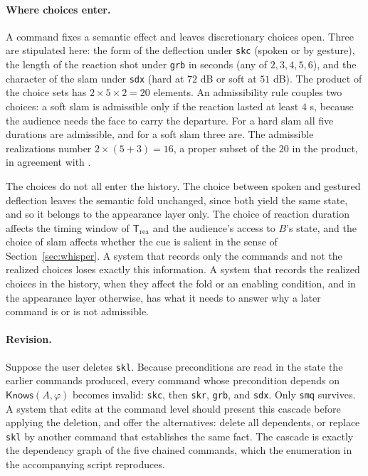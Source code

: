 \paragraph{Where choices enter.} A command fixes a semantic effect and leaves discretionary choices open. Three are stipulated here: the form of the deflection under \texttt{skc} (spoken or by gesture), the length of the reaction shot under \texttt{grb} in seconds (any of $2,3,4,5,6$), and the character of the slam under \texttt{sdx} (hard at $72$ dB or soft at $51$ dB). The product of the choice sets has $2\times5\times2=20$ elements. An admissibility rule couples two choices: a soft slam is admissible only if the reaction lasted at least $4$ s, because the audience needs the face to carry the departure. For a hard slam all five durations are admissible, and for a soft slam three are. The admissible realizations number $2\times(5+3)=16$, a proper subset of the $20$ in the product, in agreement with .

The choices do not all enter the history. The choice between spoken and gestured deflection leaves the semantic fold unchanged, since both yield the same state, and so it belongs to the appearance layer only. The choice of reaction duration affects the timing window of $\mathsf{T}_{\mathrm{rea}}$ and the audience's access to $B$'s state, and the choice of slam affects whether the cue is salient in the sense of Section~\ref{sec:whisper}. A system that records only the commands and not the realized choices loses exactly this information. A system that records the realized choices in the history, when they affect the fold or an enabling condition, and in the appearance layer otherwise, has what it needs to answer why a later command is or is not admissible.

\paragraph{Revision.} Suppose the user deletes \texttt{skl}. Because preconditions are read in the state the earlier commands produced, every command whose precondition depends on $\mathsf{Knows}(A,\varphi)$ becomes invalid: \texttt{skc}, then \texttt{skr}, \texttt{grb}, and \texttt{sdx}. Only \texttt{smq} survives. A system that edits at the command level should present this cascade before applying the deletion, and offer the alternatives: delete all dependents, or replace \texttt{skl} by another command that establishes the same fact. The cascade is exactly the dependency graph of the five chained commands, which the enumeration in the accompanying script reproduces.

